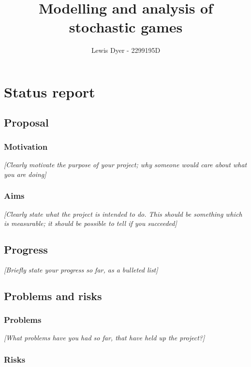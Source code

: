 \documentclass[11pt]{article}
\title{Modelling and analysis of stochastic games}
\author{ Lewis Dyer - 2299195D}
\begin{document}
    \maketitle
    
    
     

\section{Status report}

\subsection{Proposal}\label{proposal}

\subsubsection{Motivation}\label{motivation}

\emph{{[}Clearly motivate the purpose of your project; why someone would
care about what you are doing{]}}

\subsubsection{Aims}\label{aims}

\emph{{[}Clearly state what the project is intended to do. This should
be something which is measurable; it should be possible to tell if you
succeeded{]}}

\subsection{Progress}\label{progress}

\emph{{[}Briefly state your progress so far, as a bulleted list{]}}

\subsection{Problems and risks}\label{problems-and-risks}

\subsubsection{Problems}\label{problems}

\emph{{[}What problems have you had so far, that have held up the
project?{]}}

\subsubsection{Risks}\label{risks}
\end{document}
